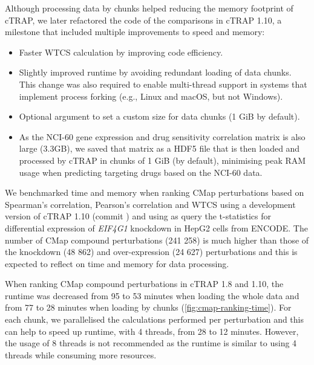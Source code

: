 Although processing data by chunks helped reducing the memory footprint of cTRAP, we later refactored the code of the comparisons in cTRAP 1.10, a milestone that included multiple improvements to speed and memory:

\begin{itemize}
	\item Faster WTCS calculation by improving code efficiency.
	\item Slightly improved runtime by avoiding redundant loading of data chunks. This change was also required to enable multi-thread support in systems that implement process forking (e.g., Linux and macOS, but not Windows).
	\item Optional argument to set a custom size for data chunks (1 GiB by default).
	\item As the NCI-60 gene expression and drug sensitivity correlation matrix is also large (3.3GB), we saved that matrix as a HDF5 file that is then loaded and processed by cTRAP in chunks of 1 GiB (by default), minimising peak RAM usage when predicting targeting drugs based on the NCI-60 data.
\end{itemize}

We benchmarked time and memory when ranking CMap perturbations based on Spearman's correlation, Pearson's correlation and WTCS using a development version of cTRAP 1.10 (commit ) and using as query the t-statistics for differential expression of \emph{EIF4G1} knockdown in HepG2 cells from ENCODE. The number of CMap compound perturbations (241 258) is much higher than those of the knockdown (48 862) and over-expression (24 627) perturbations and this is expected to reflect on time and memory for data processing.

When ranking CMap compound perturbations in cTRAP 1.8 and 1.10, the runtime was decreased from 95 to 53 minutes when loading the whole data and from 77 to 28 minutes when loading by chunks (\autoref{fig:cmap-ranking-time}). For each chunk, we parallelised the calculations performed per perturbation and this can help to speed up runtime, with 4 threads, from 28 to 12 minutes. However, the usage of 8 threads is not recommended as the runtime is similar to using 4 threads while consuming more resources.

